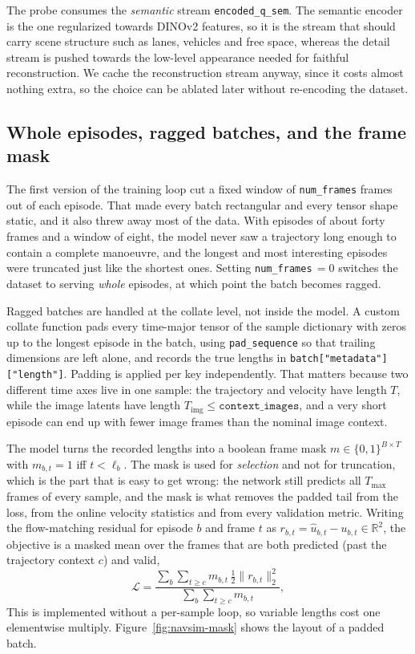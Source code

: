 The probe consumes the \emph{semantic} stream \texttt{encoded\_q\_sem}. The
semantic encoder is the one regularized towards DINOv2 features, so it is the
stream that should carry scene structure such as lanes, vehicles and free space,
whereas the detail stream is pushed towards the low-level appearance needed for
faithful reconstruction. We cache the reconstruction stream anyway, since it
costs almost nothing extra, so the choice can be ablated later without
re-encoding the dataset.

\subsection{Whole episodes, ragged batches, and the frame mask}
\label{sec:navsim-padding}

The first version of the training loop cut a fixed window of
\texttt{num\_frames} frames out of each episode. That made every batch
rectangular and every tensor shape static, and it also threw away most of the
data. With episodes of about forty frames and a window of eight, the model never
saw a trajectory long enough to contain a complete manoeuvre, and the longest and
most interesting episodes were truncated just like the shortest ones. Setting
\texttt{num\_frames}$\,=0$ switches the dataset to serving \emph{whole}
episodes, at which point the batch becomes ragged.

Ragged batches are handled at the collate level, not inside the model. A custom
collate function pads every time-major tensor of the sample dictionary with zeros
up to the longest episode in the batch, using \texttt{pad\_sequence} so that
trailing dimensions are left alone, and records the true lengths in
\texttt{batch["metadata"]["length"]}. Padding is applied per key independently.
That matters because two different time axes live in one sample: the trajectory
and velocity have length $T$, while the image latents have length
$T_{\text{img}}\le\texttt{context\_images}$, and a very short episode can end up
with fewer image frames than the nominal image context.

The model turns the recorded lengths into a boolean frame mask
$m\in\{0,1\}^{B\times T}$ with $m_{b,t}=1$ iff $t<\ell_b$. The mask is used for
\emph{selection} and not for truncation, which is the part that is easy to get
wrong: the network still predicts all $T_{\max}$ frames of every sample, and the
mask is what removes the padded tail from the loss, from the online velocity
statistics and from every validation metric. Writing the flow-matching residual
for episode $b$ and frame $t$ as $r_{b,t}=\hat u_{b,t}-u_{b,t}\in\mathbb{R}^2$,
the objective is a masked mean over the frames that are both predicted (past the
trajectory context $c$) and valid,
\begin{equation}
\mathcal{L}
= \frac{\displaystyle\sum_{b}\sum_{t\ge c} m_{b,t}\,\tfrac{1}{2}\lVert r_{b,t}\rVert_2^2}
       {\displaystyle\sum_{b}\sum_{t\ge c} m_{b,t}},
\label{eq:masked-loss}
\end{equation}
This is implemented without a per-sample loop, so variable lengths cost one
elementwise multiply. Figure~\ref{fig:navsim-mask} shows the layout of a padded
batch.

